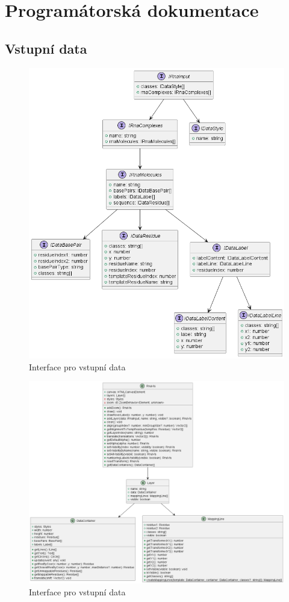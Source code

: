 
\chapter{Programátorská dokumentace}

\section{Vstupní data}

\begin{figure}[H]
  \centering
  \includegraphics[width=145mm]{../img/rnaInput.png}
  \caption{Interface pro vstupní data}
\end{figure}

\begin{figure}[H]
  \centering
  \includegraphics[width=145mm]{../img/rnaVis.png}
  \caption{Interface pro vstupní data}
\end{figure}

